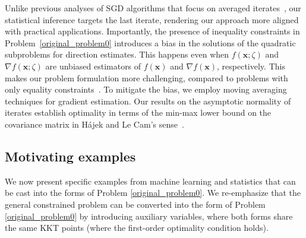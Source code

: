 \documentclass[aos]{imsart}
\numberwithin{equation}{section}
\theoremstyle{plain}
\newcommand{\michael}[1]{\textcolor{red}{Michael:\ #1}}
\begin{document}
Unlike previous analyses of SGD algorithms that focus on averaged iterates~\cite{polyak1992acceleration, chen2020statistical}, our statistical inference targets the last iterate, rendering our approach more aligned with practical applications.
Importantly, the presence of inequality constraints in Problem~\eqref{original_problem0} introduces a bias in the solutions of the quadratic subproblems for direction estimates. 
This happens even when $f(\bm{x}; \zeta)$ and $\nabla f(\bm{x}; \zeta)$ are unbiased estimators of $f(\bm{x})$ and $\nabla f(\bm{x})$, respectively.
This makes our problem formulation more challenging, compared to problems with only equality constraints~\cite{berahas2021sequential, na2022asymptotic}. 
To mitigate the bias, we employ moving averaging techniques for gradient estimation. 
Our results on the asymptotic normality of iterates establish optimality in terms of the min-max lower bound on the covariance matrix in H\'ajek and Le Cam's sense~\cite{duchi2021asymptotic}.



\subsection{Motivating examples}
\label{sec:1.1}
We now present specific examples from machine learning and statistics that can be cast into the forms of Problem \eqref{original_problem0}. We re-emphasize that the general constrained problem can be converted into the form of Problem \eqref{original_problem0} by introducing auxiliary variables, where both forms share the same KKT points (where the first-order optimality condition holds). 
\end{document}
